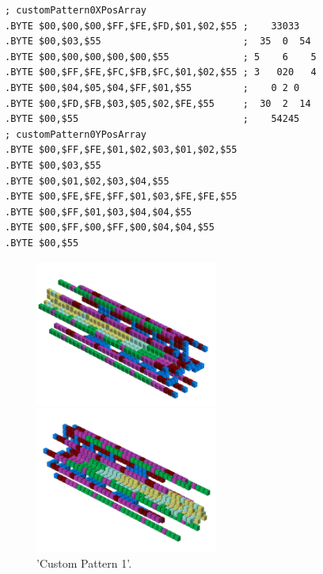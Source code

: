 \begin{minipage}[b]{0.48\linewidth}
\begin{lrbox}{\mybox}%
\begin{lstlisting}[basicstyle=\ttfamily\tiny]
; customPattern0XPosArray  
.BYTE $00,$00,$00,$FF,$FE,$FD,$01,$02,$55 ;    33033   
.BYTE $00,$03,$55                         ;  35  0  54 
.BYTE $00,$00,$00,$00,$00,$55             ; 5    6    5
.BYTE $00,$FF,$FE,$FC,$FB,$FC,$01,$02,$55 ; 3   020   4
.BYTE $00,$04,$05,$04,$FF,$01,$55         ;    0 2 0   
.BYTE $00,$FD,$FB,$03,$05,$02,$FE,$55     ;  30  2  14 
.BYTE $00,$55                             ;    54245   
; customPattern0YPosArray
.BYTE $00,$FF,$FE,$01,$02,$03,$01,$02,$55
.BYTE $00,$03,$55
.BYTE $00,$01,$02,$03,$04,$55
.BYTE $00,$FE,$FE,$FF,$01,$03,$FE,$FE,$55
.BYTE $00,$FF,$01,$03,$04,$04,$55
.BYTE $00,$FF,$00,$FF,$00,$04,$04,$55
.BYTE $00,$55
\end{lstlisting}
\end{lrbox}%
\scalebox{0.8}{\usebox{\mybox}}

\end{minipage}
\begin{minipage}[b]{0.50\linewidth}
\begin{figure}[H]
    \centering
    \begin{adjustbox}{width=6cm,margin=0cm 0cm}
      \includegraphics[width=6cm]{src/patterns/pattern9-45.png}%
    \end{adjustbox}
    \begin{adjustbox}{width=6cm,margin=0cm -1.8cm}
      \includegraphics[width=6cm]{src/patterns/pattern9-225.png}%
    \end{adjustbox}
\caption{'Custom Pattern 1'.}
\end{figure}
\end{minipage}
